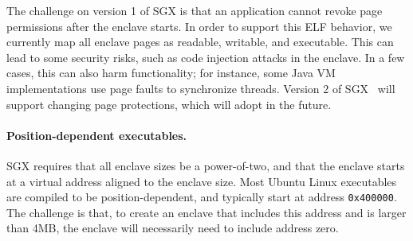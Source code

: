 The challenge on version 1 of SGX is that an application cannot revoke page
permissions after the enclave starts.
In order to support this ELF behavior, we currently map all enclave pages
as readable, writable, and executable.
This can lead to some security risks, such as code injection attacks in the enclave.
In a few cases, this can also harm functionality; for instance, some Java VM implementations
use page faults to synchronize threads.
Version 2 of SGX~\cite{sgx2} will support changing page protections,
which \graphenesgx{} will adopt in the future. %


\begin{comment}
The current version of SGX hardware requires the maximum enclave size to be specified at initialization time.
Thus, \graphenesgx{} also allows the user to specify a reserved heap size,


has to reserve a heap space in each enclave, in order to load application binaries
or to create anonymous mappings.
The in-enclave heap needs to have full access permissions, as readable, writable, and executable,
to be dynamically allocated as user memory mappings.
On current x86/64 architecture, memory permissions cannot be revoked after enclave creation.
Retaining full access permissions on the whole in-enclave heap can cause security issues, such as code injection or reusing data sections as {\em gadgets}.
We expect this vulnerability will be fixed on \sgx{}2~\cite{sgx2}, the next-generation \sgx{} hardware, which provides new instructions to support dynamic memory protection.
In general, making the heap readable, writable, and executable does not hurt compatibility, besides some applications like JVM runtimes that rely on protecting memory to synchronize.
\end{comment}




\paragraph{Position-dependent executables.}
SGX requires that all enclave sizes be a power-of-two,
and that the enclave starts at a virtual address aligned to the enclave size.
Most Ubuntu Linux executables are compiled to be position-dependent, and typically 
start at address 
{\tt 0x400000}.  The challenge is that, to create an enclave  that includes this address and is larger than 4MB, the enclave
will necessarily need to include address zero.

